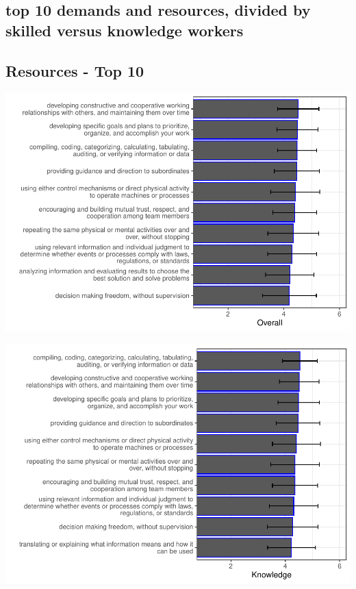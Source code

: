 \documentclass[
  english,
  man]{apa6}
\begin{document}
\hypertarget{top-10-demands-and-resources-divided-by-skilled-versus-knowledge-workers}{%
\subsection{top 10 demands and resources, divided by skilled versus knowledge workers}\label{top-10-demands-and-resources-divided-by-skilled-versus-knowledge-workers}}

\hypertarget{resources---top-10}{%
\subsection{Resources - Top 10}\label{resources---top-10}}

\includegraphics{SIOPjdr2_files/figure-latex/unnamed-chunk-1-1.pdf}

\includegraphics{SIOPjdr2_files/figure-latex/unnamed-chunk-2-1.pdf}
\end{document}
